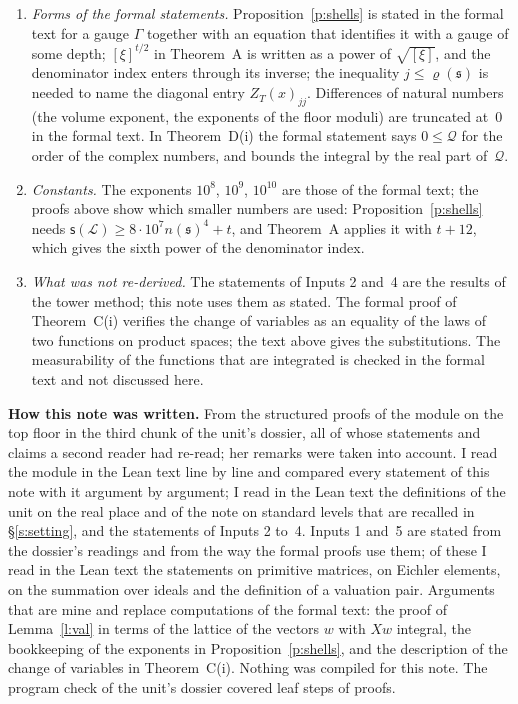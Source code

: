 \documentclass[11pt,a4paper]{article}
\newcommand{\m}[1]{\mbox{$#1$}}        %
\newcommand{\subhead}[1]{\par\addvspace{9pt plus 2pt}\Needspace{4\baselineskip}\noindent\textbf{#1}\enspace\ignorespaces}
\theoremstyle{plainx}
\theoremstyle{uprightx}
\newcommand{\fs}{\mathfrak{s}}                      %
\newcommand{\cL}{\mathcal{L}}                       %
\newcommand{\rh}[1]{\varrho(#1)}                    %
\newcommand{\nn}[1]{n(#1)}                          %
\newcommand{\ZT}[2]{Z_{#1}(#2)}                     %
\newcommand{\gix}[1]{[#1]}                          %
\newcommand{\vexp}[1]{\mathsf{s}(#1)}               %
\begin{document}
\begin{enumerate}[leftmargin=1.6em,itemsep=3pt]
inversion is continuous at~$1$. Both hold for a finite product of local fields; they are hypotheses here
because the formal notion of a semilocal field is axiomatic. In Theorem~D(ii) the matrix $R$ is arbitrary.
\item \emph{Forms of the formal statements.} Proposition~\ref{p:shells} is stated in the formal text for a
gauge $\Gamma$ together with an equation that identifies it with a gauge of some depth; \m{\gix{\xi}^{t/2}} in
Theorem~A is written as a power of \m{\sqrt{\gix{\xi}}}, and the denominator index enters through its inverse;
the inequality \m{j\le\rh{\fs}} is needed to name the diagonal entry \m{\ZT{T}{x}_{jj}}. Differences of natural
numbers (the volume exponent, the exponents of the floor moduli) are truncated at~$0$ in the formal text. In
Theorem~D(i) the formal statement says \m{0\le\mathcal Q} for the order of the complex numbers, and bounds the
integral by the real part of~$\mathcal Q$.
\item \emph{Constants.} The exponents \m{10^8}, \m{10^9}, \m{10^{10}} are those of the formal text; the proofs
above show which smaller numbers are used: Proposition~\ref{p:shells} needs
\m{\vexp{\cL}\ge8\cdot10^7\nn{\fs}^4+t}, and Theorem~A applies it with \m{t+12}, which gives the sixth power of the
denominator index.
\item \emph{What was not re-derived.} The statements of Inputs 2 and~4 are the results of the tower method; this
note uses them as stated. The formal proof of Theorem~C(i) verifies the change of variables as an equality of
the laws of two functions on product spaces; the text above gives the substitutions. The measurability of the
functions that are integrated is checked in the formal text and not discussed here.
\end{enumerate}

\subhead{How this note was written.} From the structured proofs of the module on the top floor in the third
chunk of the unit's dossier, all of whose statements and claims a second reader had re-read; her remarks were
taken into account. I read the module in the Lean text line by line and compared every statement of this note
with it argument by argument; I read in the Lean text the definitions of the unit on the real place and of the
note on standard levels that are recalled in §\ref{s:setting}, and the statements of Inputs 2 to~4. Inputs 1
and~5 are stated from the dossier's readings and from the way the formal proofs use them; of these I read in the
Lean text the statements on primitive matrices, on Eichler elements, on the summation over ideals and the
definition of a valuation pair. Arguments that are mine and replace computations of the formal text: the proof
of Lemma~\ref{l:val} in terms of the lattice of the vectors $w$ with $Xw$ integral, the bookkeeping of the
exponents in Proposition~\ref{p:shells}, and the description of the change of variables in Theorem~C(i).
Nothing was compiled for this note. The program check of the unit's dossier covered \UnitSteps{} leaf steps of
\UnitProofs{} proofs.
\end{document}
